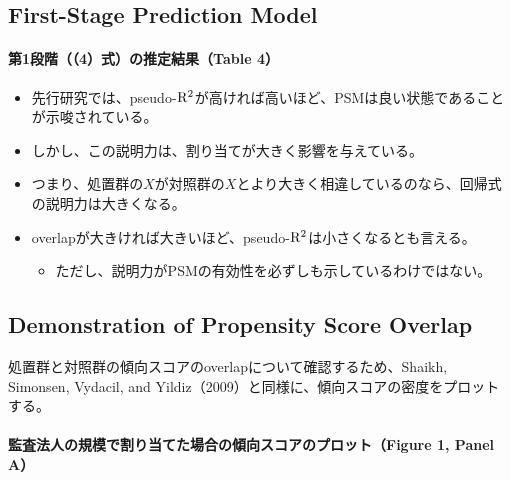 \subsection*{First-Stage Prediction Model}

\paragraph{第1段階（（4）式）の推定結果（Table 4）}

\begin{itemize}
 \item 先行研究では、pseudo-${\rm R^2}$が高ければ高いほど、PSMは良い状態であることが示唆されている。
 \item しかし、この説明力は、割り当てが大きく影響を与えている。
 \item つまり、処置群の$X$が対照群の$X$とより大きく相違しているのなら、回帰式の説明力は大きくなる。
 \item overlapが大きければ大きいほど、pseudo-${\rm R^2}$は小さくなるとも言える。
  \begin{itemize}
   \item ただし、説明力がPSMの有効性を必ずしも示しているわけではない。
  \end{itemize}
\end{itemize}

\subsection*{Demonstration of Propensity Score Overlap}

処置群と対照群の傾向スコアのoverlapについて確認するため、Shaikh, Simonsen, Vydacil, and Yildiz（2009）と同様に、傾向スコアの密度をプロットする。

\paragraph{監査法人の規模で割り当てた場合の傾向スコアのプロット（Figure 1, Panel A）}

